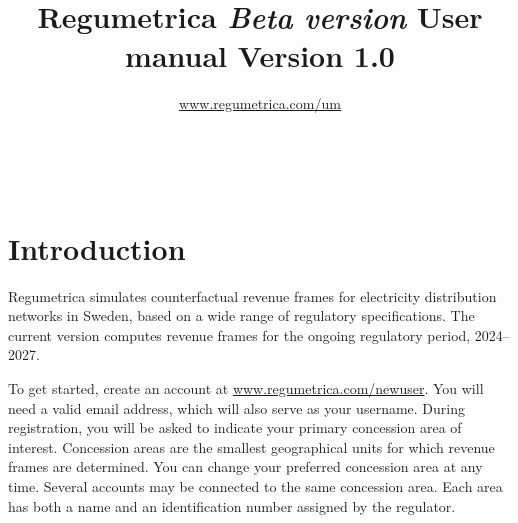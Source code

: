 
\graphicspath{ {../../../graphs/} }
\makeatletter
{}
\makeatother
\captionsetup[table]{labelsep=period}

	\title{Regumetrica \linebreak \emph{Beta version} \linebreak User manual \linebreak Version 1.0 \emph{}  \\}
	\author{\href{https://www.regumetrica.com/um}{www.regumetrica.com/um} }
	\maketitle
    \begin{center}
 \emph{} \\

	\end{center}
	\begin{singlespace}

\end{singlespace}
\setcounter{page}{1}
\doublespacing

\tableofcontents

\newpage
\section*{Introduction}
Regumetrica simulates counterfactual revenue frames for electricity distribution networks in Sweden, based on a wide range of regulatory specifications. The current version computes revenue frames for the ongoing regulatory period, 2024--2027.

To get started, create an account at \href{https://www.regumetrica.com/newuser}{www.regumetrica.com/newuser}. You will need a valid email address, which will also serve as your username. During registration, you will be asked to indicate your primary concession area of interest. Concession areas are the smallest geographical units for which revenue frames are determined. You can change your preferred concession area at any time. Several accounts may be connected to the same concession area. Each area has both a name and an identification number assigned by the regulator.

